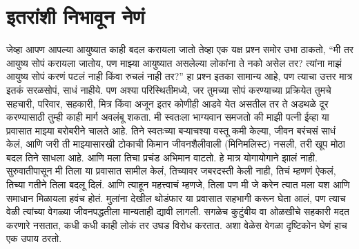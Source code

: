  \chapter{इतरांशी निभावून नेणं}
जेव्हा आपण आपल्या आयुष्यात काही बदल करायला जातो तेव्हा एक यक्ष प्रश्न समोर उभा ठाकतो, “मी तर आयुष्य सोपं करायला जातोय, पण माझ्या आयुष्यात असलेल्या लोकांना ते नको असेल तर? त्यांना माझं आयुष्य सोपं करणं पटलं नाही किंवा रुचलं नाही तर?”
हा प्रश्न इतका सामान्य आहे, पण त्याचा उत्तर मात्र इतकं सरळसोपं, साधं नाहीये. 
पण अश्या परिस्थितीमध्ये, जर तुमच्या सोपं करण्याच्या प्रक्रियेत तुमचे सहचारी, परिवार, सहकारी, मित्र किंवा अजून इतर कोणीही आडवे येत असतील तर ते अडथळे दूर करण्यासाठी तुम्ही काही मार्ग अवलंबू शकता. 
मी स्वतःला भाग्यवान समजतो की माझी पत्नी ईव्हा या प्रवासात माझ्या बरोबरीने चालते आहे. तिने स्वतःच्या बऱ्याचश्या वस्तू कमी केल्या, जीवन बरंचसं साधं केलं, आणि जरी ती माझ्यासारखी टोकाची किमान जीवनशैलीवाली (मिनिमलिस्ट) नसली, तरी खूप मोठा बदल तिने साधला आहे. आणि मला तिचा प्रचंड अभिमान वाटतो.
हे मात्र योगायोगाने झालं नाही. सुरुवातीपासून मी तिला या प्रवासात सामील केलं, तिच्यावर जबरदस्ती केली नाही, तिचं म्हणणं ऐकलं, तिच्या गतीने तिला बदलू दिलं. आणि त्याहून महत्त्वाचं म्हणजे, तिला पण मी जे करेन त्यात मला यश आणि समाधान मिळायला हवंच होतं. 
मुलांना देखील थोडंफार या प्रवासात सहभागी करून घेता आलं, पण त्याच वेळी त्यांच्या वेगळ्या जीवनपद्धतीला मान्यताही द्यावी लागली. सगळेच कुटुंबीय वा ओळखीचे सहकारी मदत करणारे नसतात, कधी कधी काही लोकं तर उघड विरोध करतात. अशा वेळेस वेगळा दृष्टिकोन घेणं हाच एक उपाय ठरतो.
